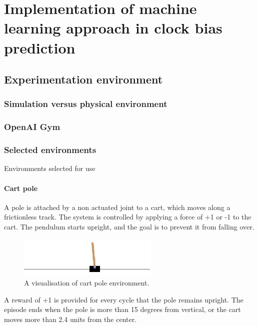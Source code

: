 \FloatBarrier
\chapter{Implementation of machine learning approach in clock bias prediction}


\FloatBarrier
\section{Experimentation environment}

\FloatBarrier
\subsection{Simulation versus physical environment}

\FloatBarrier
\subsection{OpenAI Gym}

\FloatBarrier
\subsection{Selected environments}
Environments selected for use 

\FloatBarrier
\subsubsection{Cart pole}
A pole is attached by a non actuated joint to a cart, which moves along a frictionless track.
The system is controlled by applying a force of +1 or -1 to the cart.
The pendulum starts upright, and the goal is to prevent it from falling over. 
\begin{figure}[htb] 
	\centering
	\includegraphics[width=0.6\textwidth]{figures/cartpole}
	\caption{A visualisation of cart pole environment.}
	\label{fig:cartpole}
\end{figure}
A reward of +1 is provided for every cycle that the pole remains upright.
The episode ends when the pole is more than 15 degrees from vertical, or the cart moves more 
than 2.4 units from the center.

